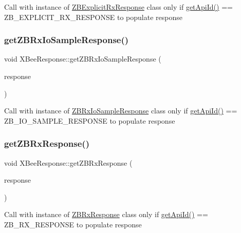 Call with instance of \hyperlink{class_z_b_explicit_rx_response}{Z\+B\+Explicit\+Rx\+Response} class only if \hyperlink{class_x_bee_response_a4a9677e3b39054119fa278d1ad52130a}{get\+Api\+Id()} == Z\+B\+\_\+\+E\+X\+P\+L\+I\+C\+I\+T\+\_\+\+R\+X\+\_\+\+R\+E\+S\+P\+O\+N\+SE to populate response \hypertarget{class_x_bee_response_a0c1f8d66b1b276fd6d482c589d5cda3d}{}\label{class_x_bee_response_a0c1f8d66b1b276fd6d482c589d5cda3d} 
\subsubsection{\texorpdfstring{get\+Z\+B\+Rx\+Io\+Sample\+Response()}{getZBRxIoSampleResponse()}}
{\footnotesize\ttfamily void X\+Bee\+Response\+::get\+Z\+B\+Rx\+Io\+Sample\+Response (\begin{DoxyParamCaption}\item[{\hyperlink{class_x_bee_response}{X\+Bee\+Response} \&}]{response }\end{DoxyParamCaption})}

Call with instance of \hyperlink{class_z_b_rx_io_sample_response}{Z\+B\+Rx\+Io\+Sample\+Response} class only if \hyperlink{class_x_bee_response_a4a9677e3b39054119fa278d1ad52130a}{get\+Api\+Id()} == Z\+B\+\_\+\+I\+O\+\_\+\+S\+A\+M\+P\+L\+E\+\_\+\+R\+E\+S\+P\+O\+N\+SE to populate response \hypertarget{class_x_bee_response_a4c0edfc6be81349237956531a006d3ab}{}\label{class_x_bee_response_a4c0edfc6be81349237956531a006d3ab} 
\subsubsection{\texorpdfstring{get\+Z\+B\+Rx\+Response()}{getZBRxResponse()}}
{\footnotesize\ttfamily void X\+Bee\+Response\+::get\+Z\+B\+Rx\+Response (\begin{DoxyParamCaption}\item[{\hyperlink{class_x_bee_response}{X\+Bee\+Response} \&}]{response }\end{DoxyParamCaption})}

Call with instance of \hyperlink{class_z_b_rx_response}{Z\+B\+Rx\+Response} class only if \hyperlink{class_x_bee_response_a4a9677e3b39054119fa278d1ad52130a}{get\+Api\+Id()} == Z\+B\+\_\+\+R\+X\+\_\+\+R\+E\+S\+P\+O\+N\+SE to populate response \hypertarget{class_x_bee_response_a1353f14b87b9cbdc1f8001fb8c5e9d35}{}\label{class_x_bee_response_a1353f14b87b9cbdc1f8001fb8c5e9d35} 
